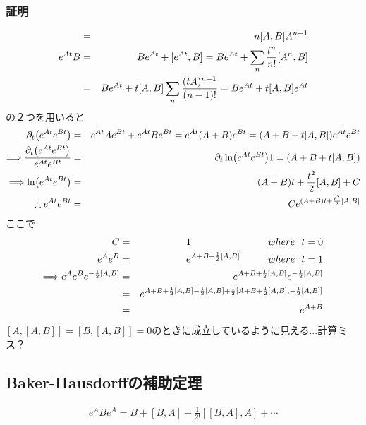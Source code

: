 \documentclass[10.5pt,a4paper]{jreport}
\begin{document}
\subsubsection{証明}
\begin{eqnarray}
  [A^n, B] &=& n[A, B]A^{n-1}\\
\nonumber  e^{At}B &=& Be^{At} + [e^{At}, B] = Be^{At} + \sum_n\frac{t^n}{n!}\qty[A^n, B]\\
  &=& Be^{At} + t\qty[A, B]\sum_n\frac{(tA)^{n-1}}{(n-1)!} = Be^{At} + t\qty[A, B]e^{At}
\end{eqnarray}
の２つを用いると
\begin{eqnarray}
  \partial_t\qty(e^{At}e^{Bt}) &=& e^{At}Ae^{Bt} + e^{At}Be^{Bt} = e^{At}(A+B)e^{Bt} = (A+B+t[A, B])e^{At}e^{Bt}\\
  \Longrightarrow \frac{\partial_t\qty(e^{At}e^{Bt})}{e^{At}e^{Bt}} &=& \partial_t\ln(e^{At}e^{Bt}) 1= (A+B+t[A, B])\\
  \Longrightarrow  \ln(e^{At}e^{Bt}) &=& (A+B)t + \frac{t^2}{2}[A, B] + C\\
  \therefore e^{At}e^{Bt} &=& Ce^{(A+B)t + \frac{t^2}{2}[A, B]}
\end{eqnarray}
ここで
\begin{eqnarray}
  C &=& 1\hspace{2.75cm} where\ \ t = 0\\
  e^Ae^B &=& e^{A+B+\frac{1}{2}[A, B]}\hspace{1cm} where\ \ t = 1\\
 \nonumber \Longrightarrow e^Ae^Be^{-\frac{1}{2}[A, B]} &=& e^{A+B+\frac{1}{2}[A, B]}e^{-\frac{1}{2}[A, B]}\\
\nonumber  &=& e^{A+B+\frac{1}{2}[A, B]-\frac{1}{2}[A, B] + \frac{1}{2}[A+B+\frac{1}{2}[A, B], -\frac{1}{2}[A, B]]}\\
  &=&e^{A+B}
\end{eqnarray}
$[A, [A, B]] = [B, [A, B]] = 0$のときに成立しているように見える...計算ミス？
\subsection{Baker-Hausdorffの補助定理}
\begin{screen}
  \begin{eqnarray}
    e^ABe^A = B + [B, A] + \frac{1}{2!}[[B, A], A] + \cdots
  \end{eqnarray}
\end{screen}
\end{document}
